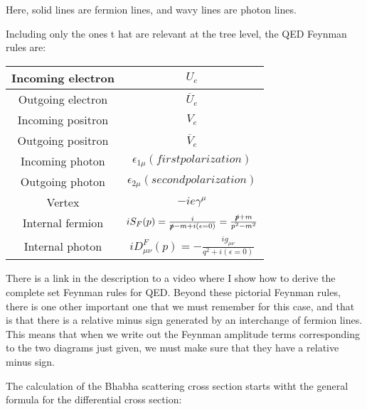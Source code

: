 \documentclass[a4]{article}
\begin{document}
    Here, solid lines are fermion lines, and wavy lines are photon lines.

    Including only the ones t hat are relevant at the tree level, the QED Feynman rules are:

    \begin{center}
        \begin{tabular}[center]{|c|c|}
            \hline
            Incoming electron & $U_{e}$ \\
            \hline
            Outgoing electron & $\overline{U}_{e}$ \\
            \hline
            Incoming positron & $V_{e}$ \\
            \hline
            Outgoing positron & $\overline{V}_{e}$ \\
            \hline
            Incoming photon & $\epsilon_{1 \mu} (first polarization)$ \\
            \hline
            Outgoing photon & $\epsilon_{2 \mu} (second polarization)$ \\
            \hline
            Vertex & $-i e \gamma^{\mu}$ \\
            \hline
            Internal fermion & $i S_{F} (p) = \frac{i}{\slashed{p} - m + i (\epsilon = 0)} = \frac{\slashed{p} + m}{p^2 - m^2}$ \\
            \hline
            Internal photon & $i D^{F}_{\mu \nu} (p) = - \frac{i g_{\mu \nu}}{q^2 + i(\epsilon = 0)}$ \\
            \hline
        \end{tabular}
    \end{center}

    There is a link in the description to a video where I show how to derive the complete set Feynman rules for QED. Beyond these pictorial Feynman rules, there is one other important one that
    we must remember for this case, and that is that there is a relative minus sign generated by an interchange of fermion lines. This means that when we write out the Feynman amplitude terms 
    corresponding  to the two diagrams just given, we must make sure that they have a relative minus sign. 

    The calculation of the Bhabha scattering cross section starts witht the general formula for the differential cross section:

    \begin{center}
    \end{center}
\end{document}
